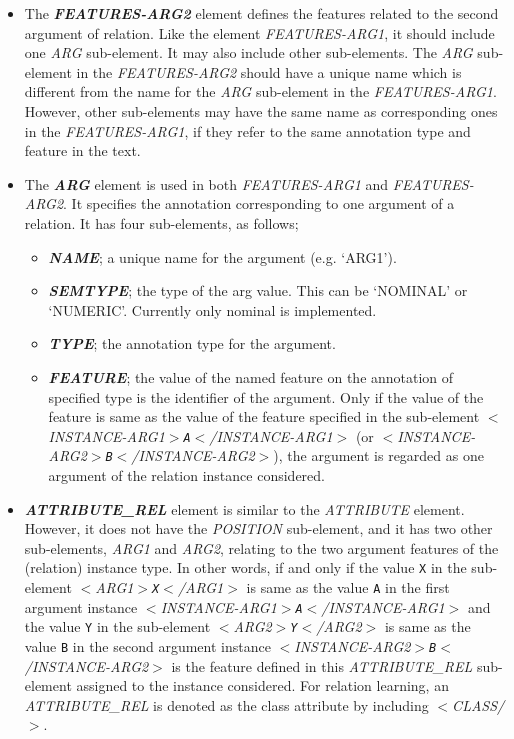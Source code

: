 \begin{itemize}
\item The {\em {\bf FEATURES-ARG2}} element defines the features related to the
second argument of relation. Like the element {\em FEATURES-ARG1}, it should
include one {\em ARG} sub-element. It may also include other sub-elements. The
{\em ARG} sub-element in the {\em FEATURES-ARG2} should have a unique name which
is different from the name for the {\em ARG} sub-element in the {\em
FEATURES-ARG1}. However, other sub-elements may have the same name as
corresponding ones in the {\em FEATURES-ARG1}, if they refer to the same
annotation type and feature in the text.

\item The {\em {\bf ARG}} element is used in both {\em FEATURES-ARG1} and
{\em FEATURES-ARG2}. It specifies the annotation corresponding to one argument
of a relation. It has four sub-elements, as follows;

\begin{itemize}
  
\item {\em {\bf NAME}}; a unique name for the argument (e.g. `ARG1').

\item {\em {\bf SEMTYPE}}; the type of the arg value. This can be `NOMINAL'
or `NUMERIC'. Currently only nominal is implemented.

\item {\em {\bf TYPE}}; the annotation type for the argument.

\item {\em {\bf FEATURE}}; the value of the named feature on the annotation of
specified type is the identifier of the argument. Only if the value of the
feature is same as the value of the feature specified in the sub-element {\em
$<$INSTANCE-ARG1$>$\texttt{A}$<$/INSTANCE-ARG1$>$} (or {\em
$<$INSTANCE-ARG2$>$\texttt{B}$<$/INSTANCE-ARG2$>$}), the argument is regarded as
one argument of the relation instance considered.

\end{itemize}

\item {\em {\bf ATTRIBUTE\_REL}} element is similar to the {\em ATTRIBUTE}
element. However, it does not have the {\em POSITION} sub-element, and it has
two other sub-elements, {\em ARG1} and {\em ARG2}, relating to the two argument
features of the (relation) instance type. In other words, if and only if the value \texttt{X}
in the sub-element {\em $<$ARG1$>$\texttt{X}$<$/ARG1$>$} is same as the value
\texttt{A} in the first argument instance
 {\em $<$INSTANCE-ARG1$>$\texttt{A}$<$/INSTANCE-ARG1$>$}  and the value
 \texttt{Y}
in the sub-element {\em $<$ARG2$>$\texttt{Y}$<$/ARG2$>$} is same as the value
\texttt{B} in the second argument instance
 {\em $<$INSTANCE-ARG2$>$\texttt{B}$<$/INSTANCE-ARG2$>$} is the feature
defined in this {\em ATTRIBUTE\_REL} sub-element assigned to the instance
considered. For relation learning, an {\em ATTRIBUTE\_REL} is denoted as the
class attribute by including {\em $<$CLASS/$>$}.

\end{itemize}

